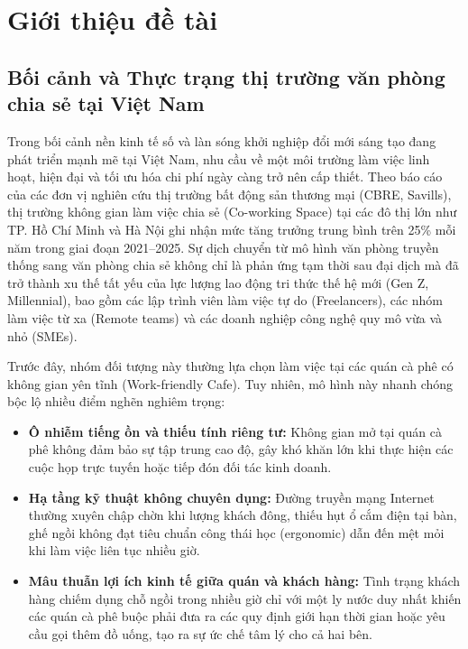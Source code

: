 \section{Giới thiệu đề tài}

\subsection{Bối cảnh và Thực trạng thị trường văn phòng chia sẻ tại Việt Nam}

Trong bối cảnh nền kinh tế số và làn sóng khởi nghiệp đổi mới sáng tạo đang phát triển mạnh mẽ tại Việt Nam, nhu cầu về một môi trường làm việc linh hoạt, hiện đại và tối ưu hóa chi phí ngày càng trở nên cấp thiết. Theo báo cáo của các đơn vị nghiên cứu thị trường bất động sản thương mại (CBRE, Savills), thị trường không gian làm việc chia sẻ (Co-working Space) tại các đô thị lớn như TP. Hồ Chí Minh và Hà Nội ghi nhận mức tăng trưởng trung bình trên 25\% mỗi năm trong giai đoạn 2021--2025. Sự dịch chuyển từ mô hình văn phòng truyền thống sang văn phòng chia sẻ không chỉ là phản ứng tạm thời sau đại dịch mà đã trở thành xu thế tất yếu của lực lượng lao động tri thức thế hệ mới (Gen Z, Millennial), bao gồm các lập trình viên làm việc tự do (Freelancers), các nhóm làm việc từ xa (Remote teams) và các doanh nghiệp công nghệ quy mô vừa và nhỏ (SMEs).

Trước đây, nhóm đối tượng này thường lựa chọn làm việc tại các quán cà phê có không gian yên tĩnh (Work-friendly Cafe). Tuy nhiên, mô hình này nhanh chóng bộc lộ nhiều điểm nghẽn nghiêm trọng:
\begin{itemize}
    \item \textbf{Ô nhiễm tiếng ồn và thiếu tính riêng tư:} Không gian mở tại quán cà phê không đảm bảo sự tập trung cao độ, gây khó khăn lớn khi thực hiện các cuộc họp trực tuyến hoặc tiếp đón đối tác kinh doanh.
    \item \textbf{Hạ tầng kỹ thuật không chuyên dụng:} Đường truyền mạng Internet thường xuyên chập chờn khi lượng khách đông, thiếu hụt ổ cắm điện tại bàn, ghế ngồi không đạt tiêu chuẩn công thái học (ergonomic) dẫn đến mệt mỏi khi làm việc liên tục nhiều giờ.
    \item \textbf{Mâu thuẫn lợi ích kinh tế giữa quán và khách hàng:} Tình trạng khách hàng chiếm dụng chỗ ngồi trong nhiều giờ chỉ với một ly nước duy nhất khiến các quán cà phê buộc phải đưa ra các quy định giới hạn thời gian hoặc yêu cầu gọi thêm đồ uống, tạo ra sự ức chế tâm lý cho cả hai bên.
\end{itemize}


